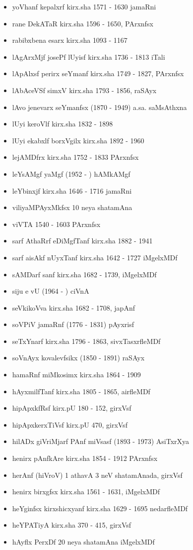 {\begin{itemize}
\item yoVhanf kepalxrf kirx.sha {\rm 1571 - 1630} jamaRni
\item rane DekATaR kirx.sha {\rm 1596 - 1650}, PArxnfsx
\item rabibxbena esarx kirx.sha {\rm 1093 - 1167}
\item lAgArxMjf josePf lUyisf kirx.sha {\rm 1736 - 1813} iTali
\item lApAlxsf perirx seYmanf kirx.sha {\rm 1749 - 1827}, PArxnfsx
\item lAbAceVSf simxV kirx.sha {\rm 1793 - 1856}, raSAyx
\item lAvo jenevarx seYmanfsx {\rm (1870 - 1949)} a.sa. saMsAthxna
\item lUyi keroVlf kirx.sha {\rm 1832 - 1898}
\item lUyi ekabxlf borxVgilx kirx.sha {\rm 1892 - 1960}
\item lejAMDfrx kirx.sha {\rm 1752 - 1833} PArxnfsx
\item leYsAMgf yaMgf {\rm (1952 - )} hAMkAMgf 
\item leYbinxjf kirx.sha {\rm 1646 - 1716} jamaRni
\item viliyaMPAyxMkfsx {\rm 10} neya shatamAna
\item viVTA {\rm 1540 - 1603} PArxnfsx
\item sarf AthaRrf eDiMgfTanf kirx.sha {\rm 1882 - 1941}
\item sarf aisAkf nUyxTanf kirx.sha {\rm 1642 - 1727} iMgelxMDf
\item sAMDarf sanf kirx.sha {\rm 1682 - 1739}, iMgelxMDf
\item siju e vU {\rm (1964 - )} ciVnA
\item seVkikoVva kirx.sha {\rm 1682 - 1708}, japAnf
\item soVPiV jamaRnf {\rm (1776 - 1831)} pAyxrisf
\item seTxYnarf kirx.sha {\rm 1796 - 1863}, sivxTasxrfleMDf
\item soVnAyx kovalevfsikx {\rm (1850 - 1891)} raSAyx
\item hamaRnf miMkosimx kirx.sha {\rm 1864 - 1909}
\item hAyxmilfTanf kirx.sha {\rm 1805 - 1865}, airfleMDf
\item hipApxkfRsf kirx.pU {\rm 180 - 152}, girxVsf
\item hipApxkerxTiVsf kirx.pU {\rm 470}, girxVsf
\item hilADx giVriMjarf PAnf miVsasf {\rm (1893 - 1973)} AsiTxrXya
\item henirx pAnfkAre kirx.sha {\rm 1854 - 1912} PArxnfsx
\item herAnf (hiVroV) {\rm 1} athavA {\rm 3} neV shatamAnada, girxVsf
\item henirx birxgfsx kirx.sha {\rm 1561 - 1631}, iMgelxMDf
\item heYginfsx kirxshicxyanf kirx.sha {\rm 1629 - 1695} nedarfleMDf
\item heYPATiyA kirx.sha {\rm 370 - 415}, girxVsf
\item hAyflx PerxDf {\rm 20} neya shatamAna iMgelxMDf
\end{itemize}

}
